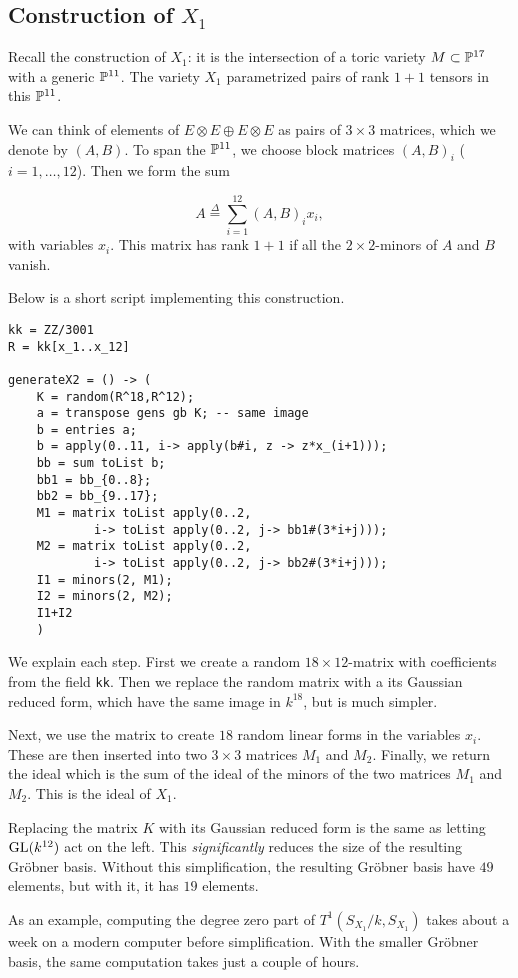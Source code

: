 \subsection{Construction of $X_1$}

Recall the construction of $X_1$: it is the intersection of a toric variety $M \subset \P^{17}$ with a generic $\P^{11}$. The variety $X_1$ parametrized pairs of rank $1+1$ tensors in this $\P^{11}$.

We can think of elements of $E \otimes E \oplus E \otimes E$ as pairs of $3 \times 3$ matrices, which we denote by $(A,B)$. To span the $\P^{11}$, we choose block matrices $\left(A,B\right)_i$ ($i=1,\ldots,12$). Then we form the sum

\[
A \stackrel \Delta = \sum_{i=1}^{12} (A,B)_i x_i,
\]
with variables $x_i$. This matrix has rank $1+1$ if all the $2 \times 2$-minors of $A$ and $B$ vanish. 

Below is a short \MM script implementing this construction.

\begin{lstlisting}[caption = Code for $X_1$, language=Macaulay2]
kk = ZZ/3001
R = kk[x_1..x_12]

generateX2 = () -> (
    K = random(R^18,R^12);
    a = transpose gens gb K; -- same image
    b = entries a;
    b = apply(0..11, i-> apply(b#i, z -> z*x_(i+1)));
    bb = sum toList b;
    bb1 = bb_{0..8};
    bb2 = bb_{9..17};
    M1 = matrix toList apply(0..2,
            i-> toList apply(0..2, j-> bb1#(3*i+j)));
    M2 = matrix toList apply(0..2,
            i-> toList apply(0..2, j-> bb2#(3*i+j)));
    I1 = minors(2, M1);
    I2 = minors(2, M2);
    I1+I2
    )
\end{lstlisting}

We explain each step. First we create a random $18 \times 12$-matrix with coefficients from the field \texttt{kk}. Then we replace the random matrix with a its Gaussian reduced form, which have the same image in $k^{18}$, but is much simpler.

Next, we use the matrix to create $18$ random linear forms in the variables $x_i$. These are then inserted into two $3 \times 3$ matrices $M_1$ and $M_2$. Finally, we return the ideal which is the sum of the ideal of the minors of the two matrices $M_1$ and $M_2$. This is the ideal of $X_1$.



\begin{remark}
Replacing the matrix $K$ with its Gaussian reduced form is the same as letting $\GL(k^{12})$ act on the left. This \emph{significantly} reduces the size of the resulting Gröbner basis. Without this simplification, the resulting Gröbner basis have $49$ elements, but with it, it has $19$ elements.

As an example, computing the degree zero part of $T^1(S_{X_1}/k,S_{X_1})$ takes about a week on a modern computer before simplification. With the smaller Gröbner basis, the same computation takes just a couple of hours.
\end{remark}

